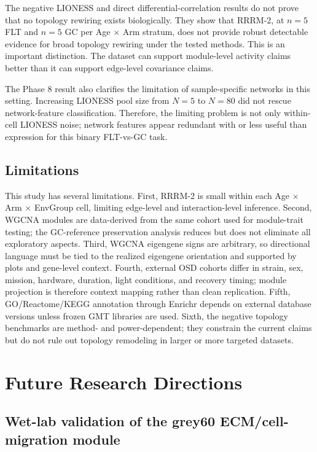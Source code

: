 \documentclass[11pt]{article}
\begin{document}
The negative LIONESS and direct differential-correlation results do not prove that no topology rewiring exists biologically. They show that RRRM-2, at $n=5$ FLT and $n=5$ GC per Age $\times$ Arm stratum, does not provide robust detectable evidence for broad topology rewiring under the tested methods. This is an important distinction. The dataset can support module-level activity claims better than it can support edge-level covariance claims.

The Phase 8 result also clarifies the limitation of sample-specific networks in this setting. Increasing LIONESS pool size from $N=5$ to $N=80$ did not rescue network-feature classification. Therefore, the limiting problem is not only within-cell LIONESS noise; network features appear redundant with or less useful than expression for this binary FLT-vs-GC task.

\subsection{Limitations}

This study has several limitations. First, RRRM-2 is small within each Age $\times$ Arm $\times$ EnvGroup cell, limiting edge-level and interaction-level inference. Second, WGCNA modules are data-derived from the same cohort used for module-trait testing; the GC-reference preservation analysis reduces but does not eliminate all exploratory aspects. Third, WGCNA eigengene signs are arbitrary, so directional language must be tied to the realized eigengene orientation and supported by plots and gene-level context. Fourth, external OSD cohorts differ in strain, sex, mission, hardware, duration, light conditions, and recovery timing; module projection is therefore context mapping rather than clean replication. Fifth, GO/Reactome/KEGG annotation through Enrichr depends on external database versions unless frozen GMT libraries are used. Sixth, the negative topology benchmarks are method- and power-dependent; they constrain the current claims but do not rule out topology remodeling in larger or more targeted datasets.

\section{Future Research Directions}

\subsection{Wet-lab validation of the grey60 ECM/cell-migration module}
\end{document}
